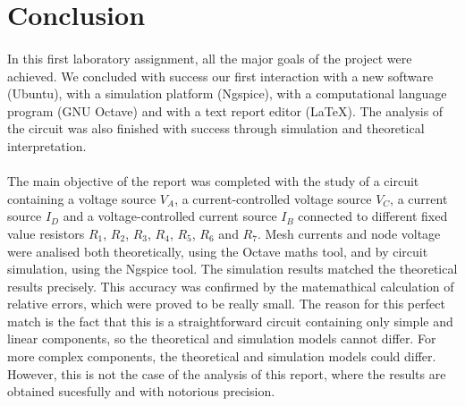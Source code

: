 \section{Conclusion}
\label{sec:conclusion}

\paragraph{}
In this first laboratory assignment, all the major goals of the project were achieved. We concluded with success our first interaction with a new software (Ubuntu), with a simulation platform (Ngspice), with a computational language program (GNU Octave) and with a text report editor (LaTeX). The analysis of the circuit was also finished with success through simulation and theoretical interpretation.

\paragraph{}
The main objective of the report was completed with the study of a circuit containing a voltage source $V_A$, a current-controlled voltage source $V_C$, a current source $I_D$ and a voltage-controlled current source $I_B$ connected to different fixed value resistors $R_1$, $R_2$, $R_3$, $R_4$, $R_5$, $R_6$ and $R_7$. Mesh currents and node voltage were analised both theoretically, using the Octave maths tool, and by circuit simulation, using the Ngspice tool. The simulation results matched the theoretical results precisely. This accuracy was confirmed by the matemathical calculation of relative errors, which were proved to be really small. The reason for this perfect match is the fact that this is a straightforward
circuit containing only simple and linear components, so the theoretical and simulation models cannot differ. For more complex components, the theoretical and simulation models could differ. However, this is not the case of the analysis of this report, where the results are obtained sucesfully and with notorious precision.
